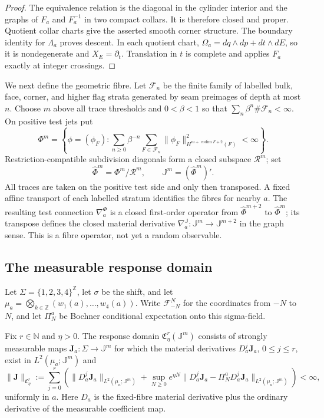\begin{proof}
The equivalence relation is the diagonal in the cylinder interior and the
graphs of $F_a$ and $F_a^{-1}$ in two compact collars.  It is therefore closed
and proper.  Quotient collar charts give the asserted smooth corner
structure.  The boundary identity for $\Lambda_a$ proves descent.  In each
quotient chart, $\Omega_a=dq\wedge dp+dt\wedge dE$, so it is nondegenerate and
$X_E=\partial_t$.  Translation in $t$ is complete and applies $F_a$ exactly at
integer crossings.
\end{proof}

We next define the geometric fibre.  Let $\mathscr F_n$ be the finite family
of labelled bulk, face, corner, and higher flag strata generated by seam
preimages of depth at most $n$.  Choose $m$ above all trace thresholds and
$0<\beta<1$ so that
$\sum_n\beta^n\#\mathscr F_n<\infty$.  On positive test jets put
\[
 \Phi^m=
 \left\{\phi=(\phi_F):
 \sum_{n\ge0}\beta^{-n}
 \sum_{F\in\mathscr F_n}
 \|\phi_F\|_{H^{m+\operatorname{codim}F+2}(F)}^2<\infty\right\}.
\]
Restriction-compatible subdivision diagonals form a closed subspace
$\mathcal R^m$; set
\[
 \widehat\Phi^m=\Phi^m/\mathcal R^m,
 \qquad \mathbb J^m=(\widehat\Phi^m)'.
\]
All traces are taken on the positive test side and only then transposed.  A
fixed affine transport of each labelled stratum identifies the fibres for
nearby $a$.  The resulting test connection $\nabla_a^\Phi$ is a closed
first-order operator from $\widehat\Phi^{m+2}$ to $\widehat\Phi^m$; its
transpose defines the closed material derivative
$\nabla_a^{\mathbb J}:\mathbb J^m\to\mathbb J^{m+2}$ in the graph sense.
This is a fibre operator, not yet a random observable.

\subsection{The measurable response domain}

Let $\Sigma=\{1,2,3,4\}^{\mathbb Z}$, let $\sigma$ be the shift, and let
$\mu_a=\bigotimes_{k\in\mathbb Z}(w_1(a),\ldots,w_4(a))$.  Write
$\mathcal F_{-N}^{N}$ for the coordinates from $-N$ to $N$, and let
$\Pi_N^a$ be Bochner conditional expectation onto this sigma-field.

\begin{definition}
\label{def:r23-a1-domain}
Fix $r\in\mathbb N$ and $\eta>0$.  The response domain
$\mathfrak C_{\eta}^{r}(\mathbb J^m)$ consists of strongly measurable maps
$\mathbf J_a:\Sigma\to\mathbb J^m$ for which the material derivatives
$D_a^j\mathbf J_a$, $0\le j\le r$, exist in
$L^2(\mu_a;\mathbb J^m)$ and
\[
 \|\mathbf J\|_{\mathfrak C_{\eta}^{r}}
 :=\sum_{j=0}^{r}\left(
 \|D_a^j\mathbf J_a\|_{L^2(\mu_a;\mathbb J^m)}
 +\sup_{N\ge0}e^{\eta N}
 \|D_a^j\mathbf J_a-\Pi_N^aD_a^j\mathbf J_a\|_{L^2(\mu_a;\mathbb J^m)}
 \right)<\infty,
\]
uniformly in $a$.  Here $D_a$ is the fixed-fibre material derivative plus the
ordinary derivative of the measurable coefficient map.
\end{definition}

